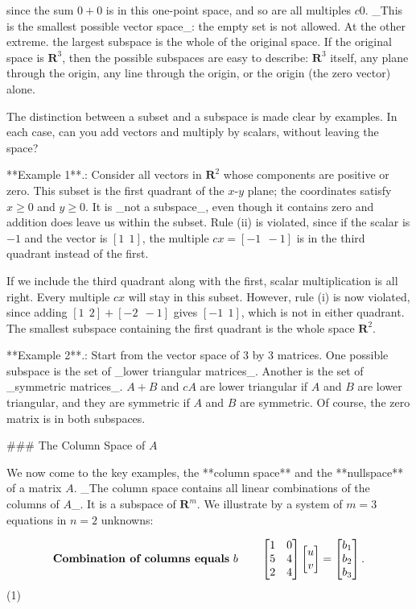 since the sum \(0+0\) is in this one-point space, and so are all multiples \(c0\). _This is the smallest possible vector space_: the empty set is not allowed. At the other extreme. the largest subspace is the whole of the original space. If the original space is \(\mathbf{R}^{3}\), then the possible subspaces are easy to describe: \(\mathbf{R}^{3}\) itself, any plane through the origin, any line through the origin, or the origin (the zero vector) alone.

The distinction between a subset and a subspace is made clear by examples. In each case, can you add vectors and multiply by scalars, without leaving the space?

**Example 1**.: Consider all vectors in \(\mathbf{R}^{2}\) whose components are positive or zero. This subset is the first quadrant of the \(x\)-\(y\) plane; the coordinates satisfy \(x\geq 0\) and \(y\geq 0\). It is _not a subspace_, even though it contains zero and addition does leave us within the subset. Rule (ii) is violated, since if the scalar is \(-1\) and the vector is \([1\ \ 1]\), the multiple \(cx=[-1\ \ -1]\) is in the third quadrant instead of the first.

If we include the third quadrant along with the first, scalar multiplication is all right. Every multiple \(cx\) will stay in this subset. However, rule (i) is now violated, since adding \([1\ \ 2]+[-2\ \ -1]\) gives \([-1\ \ 1]\), which is not in either quadrant. The smallest subspace containing the first quadrant is the whole space \(\mathbf{R}^{2}\).

**Example 2**.: Start from the vector space of 3 by 3 matrices. One possible subspace is the set of _lower triangular matrices_. Another is the set of _symmetric matrices_. \(A+B\) and \(cA\) are lower triangular if \(A\) and \(B\) are lower triangular, and they are symmetric if \(A\) and \(B\) are symmetric. Of course, the zero matrix is in both subspaces.

### The Column Space of \(A\)

We now come to the key examples, the **column space** and the **nullspace** of a matrix \(A\). _The column space contains all linear combinations of the columns of \(A\)_. It is a subspace of \(\mathbf{R}^{m}\). We illustrate by a system of \(m=3\) equations in \(n=2\) unknowns:

\[\text{\bf Combination of columns equals}\ b\qquad\begin{bmatrix}1&0\\ 5&4\\ 2&4\end{bmatrix}\begin{bmatrix}u\\ v\end{bmatrix}=\begin{bmatrix}b_{1}\\ b_{2}\\ b_{3}\end{bmatrix}.\] (1)

